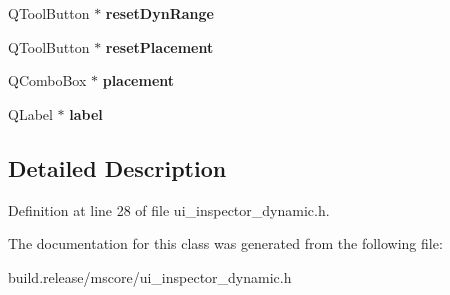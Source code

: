 \begin{DoxyCompactItemize}
Q\+Tool\+Button $\ast$ {\bfseries reset\+Dyn\+Range}
\item 
\mbox{\label{class_ui___inspector_dynamic_a48626e1c8f2d67f71d013be9511e59d4}} 
Q\+Tool\+Button $\ast$ {\bfseries reset\+Placement}
\item 
\mbox{\label{class_ui___inspector_dynamic_a430418403da320a2ce14e1af2a3c0b62}} 
Q\+Combo\+Box $\ast$ {\bfseries placement}
\item 
\mbox{\label{class_ui___inspector_dynamic_a559d64d0801ce959ab5e93dcbe05a78f}} 
Q\+Label $\ast$ {\bfseries label}
\end{DoxyCompactItemize}


\subsection{Detailed Description}


Definition at line 28 of file ui\+\_\+inspector\+\_\+dynamic.\+h.



The documentation for this class was generated from the following file\+:\begin{DoxyCompactItemize}
\item 
build.\+release/mscore/ui\+\_\+inspector\+\_\+dynamic.\+h\end{DoxyCompactItemize}
